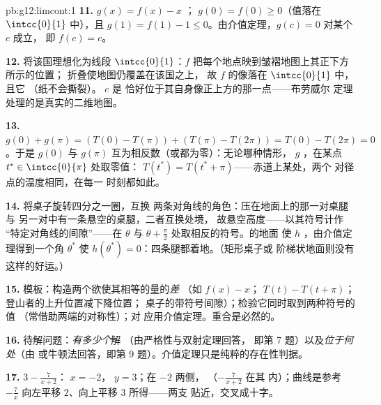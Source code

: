 \begin{solution}{pb:g12:limcont:1}
\textbf{11.} $g(x) = f(x) - x$ ；
$g(0) = f(0) \geq 0$（值落在 $\intcc{0}{1}$ 中），且
$g(1) = f(1) - 1 \leq 0$。由介值定理，$g(c) = 0$ 对某个 $c$ 成立，
即 $f(c) = c$。

\textbf{12.} 将该国理想化为线段
$\intcc{0}{1}$：$f$ 把每个地点映到皱褶地图上其正下方所示的位置；
折叠使地图仍覆盖在该国之上，
故 $f$ 的像落在 $\intcc{0}{1}$ 中，且它
（纸不会撕裂）。 $c$ 是
恰好位于其自身像正上方的那一点——布劳威尔
定理处理的是真实的二维地图。

\textbf{13.} $g(0) + g(\pi) = \left(T(0) - T(\pi)\right) +
\left(T(\pi) - T(2\pi)\right) = T(0) - T(2\pi) = 0$。于是
$g(0)$ 与 $g(\pi)$ 互为相反数（或都为零）：无论哪种情形，
$g$ ，在某点 $t^* \in \intcc{0}{\pi}$ 处取零值：
$T(t^*) = T(t^* + \pi)$——赤道上某处，两个
对径点的温度相同，在每一
时刻都如此。

\textbf{14.} 将桌子旋转四分之一圈，互换
两条对角线的角色：压在地面上的那一对桌腿与
另一对中有一条悬空的桌腿，二者互换处境，
故悬空高度——以其符号计作
“特定对角线的间隙”——在
$\theta$ 与 $\theta + \frac\pi2$ 处取相反的符号。的地面
使 $h$ ，由介值定理得到一个角
$\theta^*$ 使 $h(\theta^*) = 0$：四条腿都着地。（矩形桌子或
阶梯状地面则没有这样的好运。）

\textbf{15.} 模板：构造两个欲使其相等的量的\emph{差}
（如 $f(x) - x$；
$T(t) - T(t + \pi)$；登山者的上升位置减下降位置；
桌子的带符号间隙）；检验它同时取到两种符号的值
（常借助两端的对称性）；对
应用介值定理。重合是必然的。

\textbf{16.} 待解问题：\emph{有多少个}解
（由严格性与双射定理回答，
即第 7 题）以及\emph{位于何处}（由
或牛顿法回答，即第 9 题）。介值定理只是纯粹的存在性判据。

\textbf{17.} $3 - \frac{7}{x + 2}$：
$x = -2$， $y = 3$；在 $-2$ 两侧，
（$-\frac{7}{x+2}$ 在其
内）；曲线是参考
$-\frac7x$ 向左平移 $2$、向上平移 $3$ 所得——两支
贴近，交叉成十字。


\end{solution}
